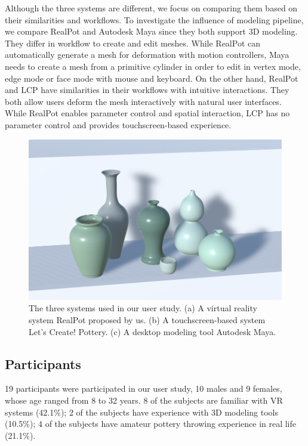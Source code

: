 \documentclass{svjour3}                     %
\begin{document}
Although the three systems are different, we focus on comparing them based on their similarities and workflows.
To investigate the influence of modeling pipeline, we compare RealPot and Autodesk Maya since they both support 3D modeling. They differ in workflow to create and edit meshes. While RealPot can automatically generate a mesh for deformation with motion controllers, Maya needs to create a mesh from a primitive cylinder in order to edit in vertex mode, edge mode or face mode with mouse and keyboard. 
On the other hand, RealPot and LCP have similarities in their workflows with intuitive interactions. They both allow users deform the mesh interactively with natural user interfaces. While RealPot enables parameter control and spatial interaction, LCP has no parameter control and provides touchscreen-based experience.
\begin{figure}
\includegraphics[width=\textwidth]{fig11}
\caption{The three systems used in our user study. (a) A virtual reality system RealPot proposed by us. (b) A touchscreen-based system Let's Create! Pottery. (c) A desktop modeling tool Autodesk Maya.}
\label{fig:sys}
\end{figure}

\subsection{Participants}
\label{sec:6.2}
19 participants were participated in our user study, 10 males and 9 females, whose age ranged from 8 to 32 years. 8 of the subjects are familiar with VR systems (42.1\%); 2 of the subjects have experience with 3D modeling tools (10.5\%); 4 of the subjects have amateur pottery throwing experience in real life (21.1\%).
\end{document}

